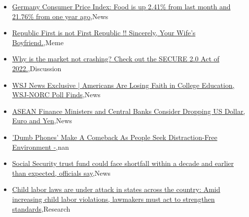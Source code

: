 \documentclass{article}%
\begin{document}
%
\begin{itemize}%
\item%
\href{https://reddit.com/r/wallstreetbets/comments/128anht/germany\_consumer\_price\_index\_food\_is\_up\_241\_from/}{Germany Consumer Price Index: Food is up 2.41\% from last month and 21.76\% from one year ago},News%
\item%
\href{https://reddit.com/r/wallstreetbets/comments/128955j/republic\_first\_is\_not\_first\_republic\_sincerely/}{Republic First is not First Republic !! Sincerely, Your Wife's Boyfriend.},Meme%
\item%
\href{https://reddit.com/r/wallstreetbets/comments/128875u/why\_is\_the\_market\_not\_crashing\_check\_out\_the/}{Why is the market not crashing? Check out the SECURE 2.0 Act of 2022.},Discussion%
\item%
\href{https://reddit.com/r/Economics/comments/128g9oz/wsj\_news\_exclusive\_americans\_are\_losing\_faith\_in/}{WSJ News Exclusive | Americans Are Losing Faith in College Education, WSJ-NORC Poll Finds},News%
\item%
\href{https://reddit.com/r/Economics/comments/128cbgu/asean\_finance\_ministers\_and\_central\_banks/}{ASEAN Finance Ministers and Central Banks Consider Dropping US Dollar, Euro and Yen},News%
\item%
\href{https://reddit.com/r/Economics/comments/128av2b/dumb\_phones\_make\_a\_comeback\_as\_people\_seek/}{'Dumb Phones' Make A Comeback As People Seek Distraction-Free Environment -},nan%
\item%
\href{https://reddit.com/r/Economics/comments/127zv32/social\_security\_trust\_fund\_could\_face\_shortfall/}{Social Security trust fund could face shortfall within a decade  and earlier than expected, officials say},News%
\item%
\href{https://reddit.com/r/Economics/comments/127vylg/child\_labor\_laws\_are\_under\_attack\_in\_states/}{Child labor laws are under attack in states across the country: Amid increasing child labor violations, lawmakers must act to strengthen standards},Research%
\end{itemize}%
\end{document}
